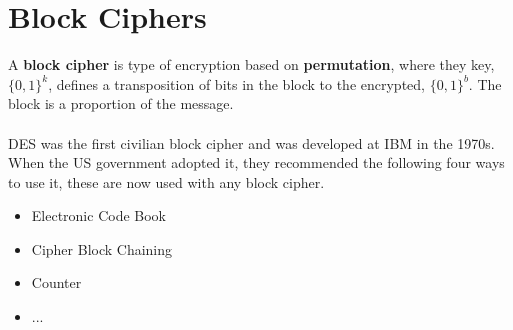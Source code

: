 
\section{Block Ciphers}
    A \textbf{block cipher} is type of encryption based on \textbf{permutation}, where they key, $\{0,1\}^k$, defines a transposition of bits in the block to the encrypted, $\{0,1\}^b$. The block is a proportion of the message.\\
    \\
    DES was the first civilian block cipher and was developed at IBM in the 1970s. When the US government adopted it, they recommended the following four ways to use it, these are now used with any block cipher.
    \begin{itemize}
        \item Electronic Code Book
        \item Cipher Block Chaining
        \item Counter
        \item ...
    \end{itemize}
    
